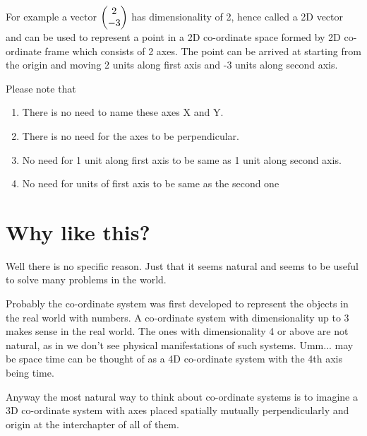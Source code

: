 \documentclass[../main.tex]{subfiles}
\begin{document}
For example a vector $ \blockcomment{Column-Vector: 2, -3} \begin{pmatrix} 2 \\  -3 \end{pmatrix} $  has dimensionality of 2, hence called a 2D vector and can be used to represent a point in a 2D co-ordinate space formed by 2D co-ordinate frame which consists of 2 axes. The point can be arrived at starting from the origin and moving 2 units along first axis and -3 units along second axis.

\begin{figure}[ht]
  \centering
\end{figure}

Please note that
\begin{enumerate}
  \item There is no need to name these axes X and Y.
  \item There is no need for the axes to be perpendicular.
  \item No need for 1 unit along first axis to be same as 1 unit along second axis.
  \item No need for units of first axis to be same as the second one
\end{enumerate}

\chapter{Why like this?}
Well there is no specific reason. Just that it seems natural and seems to be useful to solve many problems in the world.

Probably the co-ordinate system was first developed to represent the objects in the real world with numbers. A co-ordinate system with dimensionality up to 3 makes sense in the real world. The ones with dimensionality 4 or above are not natural, as in we don't see physical manifestations of such systems. Umm... may be space time can be thought of as a 4D co-ordinate system with the 4th axis being time.

Anyway the most natural way to think about co-ordinate systems is to imagine a 3D co-ordinate system with axes placed spatially mutually perpendicularly and origin at the interchapter of all of them.
\end{document}
